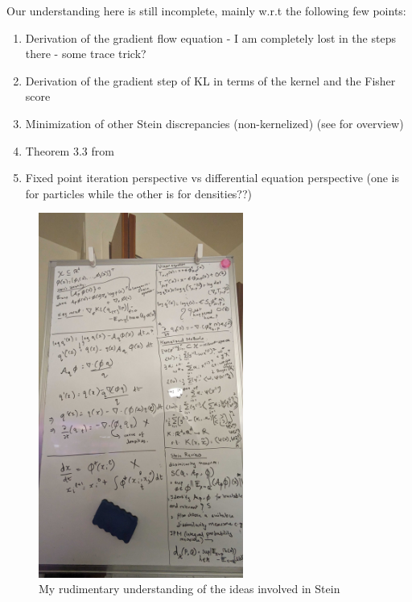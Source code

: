 \documentclass[12pt]{article}
\renewcommand{\[}{\left[}
\renewcommand{\]}{\right]}
\renewcommand{\(}{\left(}
\renewcommand{\)}{\right)}
\begin{document}
Our understanding here is still incomplete, mainly w.r.t the following few points:

\begin{enumerate}
    \item Derivation of the gradient flow equation - I am completely lost in the steps there - some trace trick?

    \item Derivation of the gradient step of KL in terms of the kernel and the Fisher score

    \item Minimization of other Stein discrepancies (non-kernelized) (see \cite{anastasiou_steins_2023} for overview)

    \item Theorem 3.3 from \cite{liu_stein_2017}

    \item Fixed point iteration perspective vs differential equation perspective (one is for particles while the other is for densities??)
\end{enumerate}

\begin{figure}[H]
    \centering
    \includegraphics[width=0.6\textwidth]{figures/stein_overview.jpg}
    \caption{My rudimentary understanding of the ideas involved in Stein}
    \label{fig:stein-big-picture}
\end{figure}
\end{document}
